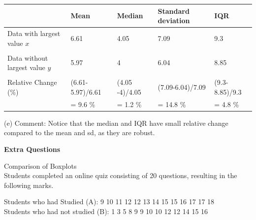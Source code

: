\documentclass[bigtut]{tutorial}\usepackage[]{graphicx}\usepackage[]{color}
\begin{document}
\begin{tutorial}
\begin{questions}
\begin{solution}
\begin{center}
\begin{tabular}{| l| l| l| l| l|} \hline
 & Mean & Median & Standard deviation & IQR  \\ \hline
Data with largest value $x$ & 6.61 & 4.05 & 7.09 & 9.3 \\  
& & & &  \\  \hline 
Data without largest value $y$ & 5.97 & 4 & 6.04 & 8.85  \\  
& & & &  \\  \hline 
Relative Change (\%) & (6.61-5.97)/6.61 & (4.05 -4)/4.05 & (7.09-6.04)/7.09 & (9.3-8.85)/9.3  \\ 
  & = 9.6 \% & = 1.2 \% & = 14.8 \% &  = 4.8 \% \\ \hline
\end{tabular} 
\end{center}



\vspace{.5cm}
(e) 
Comment: Notice that the median and IQR have small relative change compared to the mean and sd, as they are robust.
\end{solution}



\newpage
\hspace{-1cm} {\bf Extra Questions}

\question Comparison of Boxplots \\

Students completed an online quiz consisting of 20 questions, resulting in the following marks.

\begin{center}
Students who had Studied (A): 9 10 11 12 12 13 14 15 15 16 17 17 18 \\
Students who had not studied (B): 1 3 5 8 9 9 10 10 12 12 14 15 16
\end{center}


\end{questions}
\end{tutorial}
\end{document}

